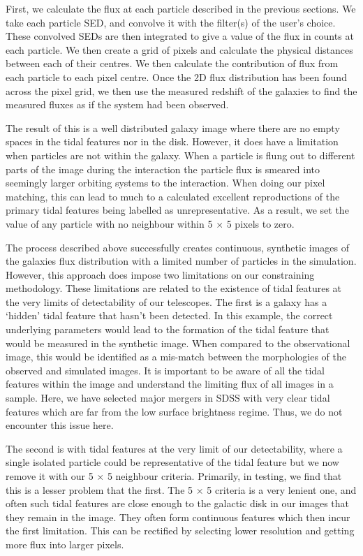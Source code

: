 First, we calculate the flux at each particle described in the previous sections. We take each particle SED, and convolve it with the filter(s) of the user's choice. These convolved SEDs are then integrated to give a value of the flux in counts at each particle. We then create a grid of pixels and calculate the physical distances between each of their centres. We then calculate the contribution of flux from each particle to each pixel centre. Once the 2D flux distribution has been found across the pixel grid, we then use the measured redshift of the galaxies to find the measured fluxes as if the system had been observed.

The result of this is a well distributed galaxy image where there are no empty spaces in the tidal features nor in the disk. However, it does have a limitation when particles are not within the galaxy. When a particle is flung out to different parts of the image during the interaction the particle flux is smeared into seemingly larger orbiting systems to the interaction. When doing our pixel matching, this can lead to much to a calculated excellent reproductions of the primary tidal features being labelled as unrepresentative. As a result, we set the value of any particle with no neighbour within 5 $\times$ 5 pixels to zero. 

The process described above successfully creates continuous, synthetic images of the galaxies flux distribution with a limited number of particles in the simulation. However, this approach does impose two limitations on our constraining methodology. These limitations are related to the existence of tidal features at the very limits of detectability of our telescopes. The first is \DIFdelbegin {}\DIFdelend \DIFaddbegin {}\DIFaddend a galaxy has a `hidden' tidal feature that hasn't been detected. In this example, the correct underlying parameters would lead to the formation of the tidal feature that would be measured in the synthetic image. When compared to the observational image, this would be identified as a mis-match between the morphologies of the observed and simulated images. It is important to be aware of all the tidal features within the image and understand the limiting flux \DIFaddbegin {}\DIFaddend of all images in a sample. Here, we have selected major mergers in SDSS with very clear tidal features which are far from the low surface brightness regime. Thus, we do not encounter this issue here.

The second is with tidal features at the very limit of our detectability, where a single isolated particle could be representative of the tidal feature but we now remove it with our 5 $\times$ 5 neighbour criteria. Primarily, in testing, we find that this is a lesser problem that the first. The 5 $\times$ 5 criteria is a very lenient one, and often such tidal features are close enough to the galactic disk in our images that they remain in the image. They often form continuous features which then incur the first limitation. This can be rectified by selecting lower resolution and getting more flux into larger pixels.


